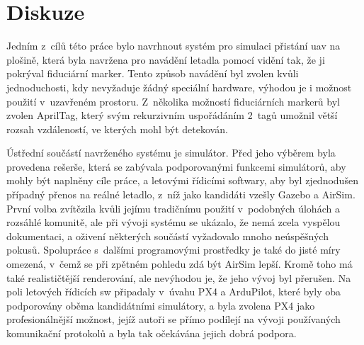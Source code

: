 \chapter{Diskuze} \label{chap:discussion}



Jedním z~cílů této práce bylo navrhnout systém pro simulaci přistání \acrshort{uav} na plošině, která byla navržena pro navádění letadla pomocí vidění tak, že ji pokrýval fiduciární marker. Tento způsob navádění byl zvolen kvůli jednoduchosti, kdy nevyžaduje žádný speciální hardware, výhodou je i možnost použití v~uzavřeném prostoru. Z~několika možností fiduciárních markerů byl zvolen AprilTag, který svým rekurzivním uspořádáním 2~tagů umožnil větší rozsah vzdáleností, ve kterých mohl být detekován.

Ústřední součástí navrženého systému je simulátor. Před jeho výběrem byla provedena rešerše, která se zabývala podporovanými funkcemi simulátorů, aby mohly být naplněny cíle práce, a letovými řídicími softwary, aby byl zjednodušen případný přenos na reálné letadlo, z~níž jako kandidáti vzešly Gazebo a AirSim. První volba zvítězila kvůli jejímu tradičnímu použití v~podobných úlohách a rozsáhlé komunitě, ale při vývoji systému se ukázalo, že nemá zcela vyspělou dokumentaci, a oživení některých součástí vyžadovalo mnoho neúspěšných pokusů. Spolupráce s~dalšími programovými prostředky je také do jisté míry omezená, v~čemž se při zpětném pohledu zdá být AirSim lepší. Kromě toho má také realističtější renderování, ale nevýhodou je, že jeho vývoj byl přerušen. Na poli letových řídicích \acrshort{sw} připadaly v~úvahu PX4 a ArduPilot, které byly oba podporovány oběma kandidátními simulátory, a byla zvolena PX4 jako profesionálnější možnost, jejíž autoři se přímo podílejí na vývoji používaných komunikační protokolů a byla tak očekávána jejich dobrá podpora.

